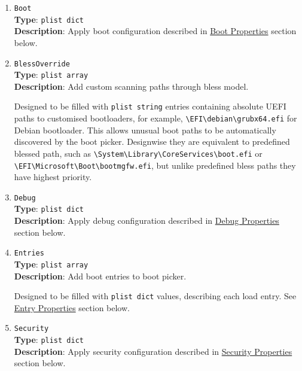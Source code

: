 \documentclass[]{article}
\begin{document}
\begin{enumerate}
\item
  \texttt{Boot}\\
  \textbf{Type}: \texttt{plist\ dict}\\
  \textbf{Description}: Apply boot configuration described in
  \hyperref[miscbootprops]{Boot Properties} section below.

\item
  \texttt{BlessOverride}\\
  \textbf{Type}: \texttt{plist\ array}\\
  \textbf{Description}: Add custom scanning paths through bless model.

  Designed to be filled with \texttt{plist\ string} entries containing
  absolute UEFI paths to customised bootloaders, for example,
  \texttt{\textbackslash EFI\textbackslash debian\textbackslash grubx64.efi}
  for Debian bootloader. This allows unusual boot paths to be automatically
  discovered by the boot picker. Designwise they are equivalent to predefined blessed path, such as
  \texttt{\textbackslash System\textbackslash Library\textbackslash CoreServices\textbackslash boot.efi}
  or \texttt{\textbackslash EFI\textbackslash Microsoft\textbackslash Boot\textbackslash bootmgfw.efi},
  but unlike predefined bless paths they have highest priority.

\item
  \texttt{Debug}\\
  \textbf{Type}: \texttt{plist\ dict}\\
  \textbf{Description}: Apply debug configuration described in
  \hyperref[miscdebugprops]{Debug Properties} section below.

\item
  \texttt{Entries}\\
  \textbf{Type}: \texttt{plist\ array}\\
  \textbf{Description}: Add boot entries to boot picker.

  Designed to be filled with \texttt{plist\ dict} values, describing each load entry.
  See \hyperref[miscentryprops]{Entry Properties} section below.

\item
  \texttt{Security}\\
  \textbf{Type}: \texttt{plist\ dict}\\
  \textbf{Description}: Apply security configuration described in
  \hyperref[miscsecurityprops]{Security Properties} section below.


\end{enumerate}
\end{document}
